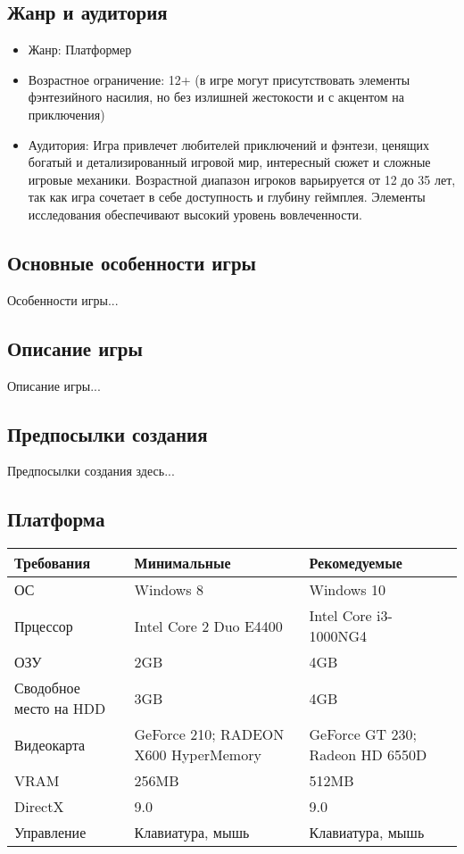 \documentclass{article}
\begin{document}
\subsection{Жанр и аудитория}
\begin{itemize}
    \item Жанр: 
    Платформер
    \item Возрастное ограничение:
    12+ (в игре могут присутствовать элементы фэнтезийного насилия, но без излишней жестокости и с акцентом на приключения)
    \item Аудитория:
    Игра привлечет любителей приключений и фэнтези, ценящих богатый и детализированный игровой мир, интересный сюжет и сложные игровые механики. Возрастной диапазон игроков варьируется от 12 до 35 лет, так как игра сочетает в себе доступность и глубину геймплея. Элементы исследования обеспечивают высокий уровень вовлеченности.
\end{itemize}

\subsection{Основные особенности игры}
Особенности игры...

\subsection{Описание игры}
Описание игры...

\subsection{Предпосылки создания}
 Предпосылки создания здесь...
\subsection{Платформа}

\begin{table}
    \begin{tabularx}{\textwidth}{|X|X|X|} \hline  
         Требования&  Минимальные& Рекомедуемые\\ \hline  
         ОС&  Windows 8& Windows 10\\ \hline  
         Прцессор&  Intel Core 2 Duo E4400& Intel Core i3-1000NG4\\ \hline  
         ОЗУ&  2GB& 4GB\\ \hline  
         Сводобное место на HDD&  3GB& 4GB\\ \hline  
         Видеокарта&   GeForce 210; RADEON X600  HyperMemory&  GeForce GT 230; Radeon HD 6550D\\ \hline  
         VRAM&  256MB& 512MB\\ \hline  
         DirectX&  9.0& 9.0\\ \hline  
         Управление&  Клавиатура, мышь& Клавиатура, мышь\\ \hline 
    \end{tabularx}
    
    
\end{table}
\end{document}

